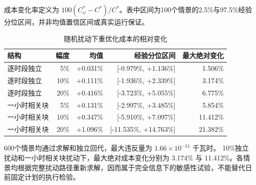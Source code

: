成本变化率定义为 $100(C_\omega^*-C^*)/C^*$。表中区间为100个情景的2.5\%与97.5\%经验分位区间，并非均值置信区间或真实运行保证。
\begin{table}[htbp]
\centering\small
\caption{随机扰动下重优化成本的相对变化}
\begin{tabular}{lrrrr}
\toprule
结构 & 幅度 & 均值 & 经验分位区间 & 最大绝对变化\\
\midrule
逐时段独立 & 5\% & +0.031\% & [-0.979\%, +1.136\%] & 1.506\%\\
逐时段独立 & 10\% & +0.111\% & [-1.936\%, +2.339\%] & 3.174\%\\
逐时段独立 & 20\% & +0.416\% & [-3.723\%, +5.055\%] & 6.775\%\\
一小时相关块 & 5\% & +0.131\% & [-2.997\%, +3.485\%] & 5.854\%\\
一小时相关块 & 10\% & +0.347\% & [-5.910\%, +7.097\%] & 11.412\%\\
一小时相关块 & 20\% & +1.096\% & [-11.535\%, +14.763\%] & 21.382\%\\
\bottomrule
\end{tabular}
\end{table}
600个情景均通过求解和独立回代，最大违反量为 $1.66\times10^{-11}$ 千瓦时。
10\%独立扰动和一小时相关块扰动下，最大绝对成本变化分别为 3.174\% 与 11.412\%。各情景均根据完整扰动路径重新求解，因而属于完全信息下的敏感性试验，不能替代日前固定计划的执行检验。

